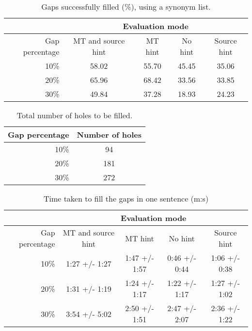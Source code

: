 \documentclass[11pt, oneside]{article}   	%
\begin{document}
\begin{table}
\centering
\begin{tabular}{|r |*{4}{c}|}
\hline
 &\multicolumn{4}{c|}{Evaluation mode}\\
\hline
Gap percentage & MT and source hint & MT hint & No hint & Source hint\\
\hline
10\%&58.02&55.70&45.45&35.06\\
20\%&65.96&68.42&33.56&33.85\\
30\%&49.84&37.28&18.93&24.23\\
\hline
\end{tabular}
\caption {Gaps successfully filled (\%), using a synonym list.} \label{tab:title} 
\end{table}

\begin{table}
\centering
\begin{tabular}{|r |*{1}{c}|}
\hline
Gap percentage & Number of holes\\
\hline
10\%&94\\
20\%&181\\
30\%&272\\
\hline
\end{tabular}
\caption {Total number of holes to be filled.} \label{tab:title}
\end{table}

\begin{table}
\centering
\begin{tabular}{|r |*{4}{c}|}
\hline
 &\multicolumn{4}{c|}{Evaluation mode}\\
\hline
Gap percentage & MT and source hint & MT hint & No hint & Source hint\\
\hline
10\%&1:27 +/- 1:27&1:47 +/- 1:57&0:46 +/- 0:44&1:06 +/- 0:38\\
20\%&1:31 +/- 1:19&1:24 +/- 1:17&1:22 +/- 1:17&1:27 +/- 1:02\\
30\%&3:54 +/- 5:02&2:50 +/- 1:51&2:47 +/- 2:07&2:36 +/- 1:22\\
\hline
\end{tabular}
\caption {Time taken to fill the gaps in one sentence (m:s)} \label{tab:title} 
\end{table}
\end{document}
